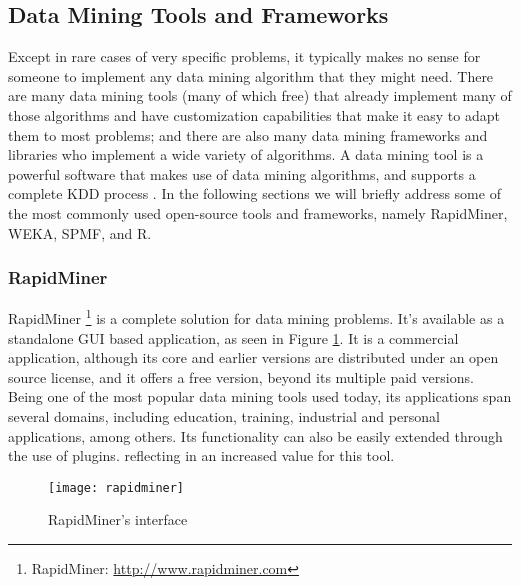 \subsection{Data Mining Tools and Frameworks}\label{sec:dmtools}
Except in rare cases of very specific problems, it typically makes no sense for someone to implement any data mining algorithm that they might need. There are many data mining tools (many of which free) that already implement many of those algorithms and have customization capabilities that make it easy to adapt them to most problems; and there are also many data mining frameworks and libraries who implement a wide variety of algorithms. A data mining tool is a powerful software that makes use of data mining algorithms, and supports a complete KDD process \cite{mikut2011data}. In the following sections we will briefly address some of the most commonly used open-source tools and frameworks, namely RapidMiner, WEKA, SPMF, and R. 

\subsubsection{RapidMiner}
RapidMiner \footnote{RapidMiner: \url{http://www.rapidminer.com}} is a complete solution for data mining problems. It’s available as a standalone GUI based application, as seen in Figure \ref{fig:rapidminer}. It is a commercial application, although its core and earlier versions are distributed under an open source license, and it offers a free version, beyond its multiple paid versions. Being one of the most popular data mining tools used today, its applications span several domains, including education, training, industrial and personal applications, among others. Its functionality can also be easily extended through the use of plugins. reflecting in an increased value for this tool.

\begin{figure}[htb]
  \begin{center}
    \leavevmode
    \texttt{[image: rapidminer]}
	\caption{RapidMiner's interface}
    \label{fig:rapidminer}
  \end{center}
\end{figure}

